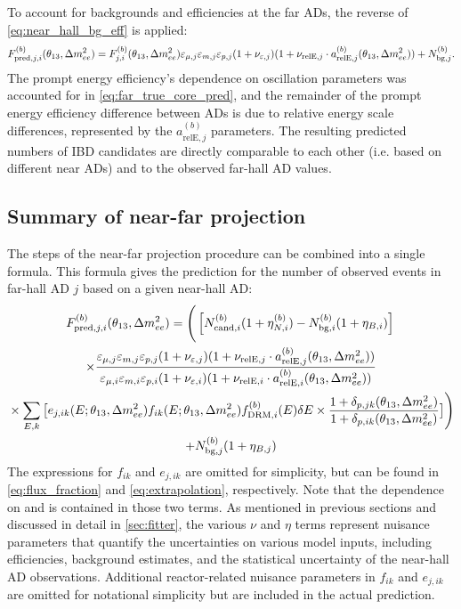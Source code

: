 To account for backgrounds and efficiencies at the far ADs,
the reverse of \cref{eq:near_hall_bg_eff} is applied:
\begin{equation}\label{eq:far_hall_bg_eff}
    F_{\text{pred},j,i}^{(b)}(\theta_{13},\Delta m^2_{ee}) = F_{j,i}^{(b)}(\theta_{13},\Delta m^2_{ee})
        \varepsilon_{\mu,j}\varepsilon_{m,j}\varepsilon_{p,j}
        (1 + \nu_{\varepsilon,j})
        (1 + \nu_{\text{relE},j}\cdot a_{\text{relE},j}^{(b)}(\theta_{13},\Delta m^2_{ee}))
    + N_{\text{bg},j}^{(b)}.
\end{equation}
The prompt energy efficiency's dependence on oscillation parameters
was accounted for in \cref{eq:far_true_core_pred},
and the remainder of the prompt energy efficiency difference between ADs
is due to relative energy scale differences,
represented by the $a_{\text{relE},j}^{(b)}$ parameters.
The resulting predicted numbers of IBD candidates
are directly comparable to each other (i.e. based on different near ADs)
and to the observed far-hall AD values.

\subsection{Summary of near-far projection}
\label{subsec:model_summary}

The steps of the near-far projection procedure can be combined into a single formula.
This formula gives the prediction for the number of observed events
in far-hall AD $j$ based on a given near-hall AD:
\begin{multline}\label{eq:full_prediction}
    F_{\text{pred},j,i}^{(b)}(\theta_{13},\Delta m^2_{ee}) =
    \Bigg(
    \left[N_{\text{cand},i}^{(b)}(1 + \eta_{N,i}^{(b)}) - N_{\text{bg},i}^{(b)}
    (1 + \eta_{B,i})\right]\bigg. \\
    \times \frac{
        \varepsilon_{\mu,j}\varepsilon_{m,j}\varepsilon_{p,j}
        (1 + \nu_{\varepsilon,j})
        (1 + \nu_{\text{relE},j}\cdot a_{\text{relE},j}^{(b)}(\theta_{13},\Delta m^2_{ee}))
    }{
        \varepsilon_{\mu,i}\varepsilon_{m,i}\varepsilon_{p,i}
        (1+\nu_{\varepsilon,i})
        (1 + \nu_{\text{relE},i}\cdot a_{\text{relE},i}^{(b)}(\theta_{13},\Delta m^2_{ee}))
    } \\
    \bigg.
    \times \sum_{E,k} \big[
        e_{j,ik}(E; \theta_{13},\Delta m^2_{ee}) f_{ik}(E; \theta_{13},\Delta m^2_{ee})
        f_{\text{DRM},i}^{(b)}(E) \delta E
    \times \frac{
        1 + \delta_{p,jk}(\theta_{13}, \Delta m^2_{ee})
    }{
        1 + \delta_{p,ik}(\theta_{13}, \Delta m^2_{ee})
    } \big] \Bigg) \\
    + N_{\text{bg},j}^{(b)}(1 + \eta_{B,j})
\end{multline}
The expressions for $f_{ik}$ and $e_{j,ik}$ are omitted for simplicity,
but can be found in \cref{eq:flux_fraction} and \cref{eq:extrapolation}, respectively.
Note that the dependence on \thetaot{} and \dmee{} is contained in those two terms.
As mentioned in previous sections and discussed in detail in \cref{sec:fitter},
the various $\nu$ and $\eta$ terms represent nuisance parameters
that quantify the uncertainties on various model inputs,
including efficiencies, background estimates,
and the statistical uncertainty of the near-hall AD observations.
Additional reactor-related nuisance parameters in $f_{ik}$ and $e_{j,ik}$ are omitted
for notational simplicity but are included in the actual prediction.

